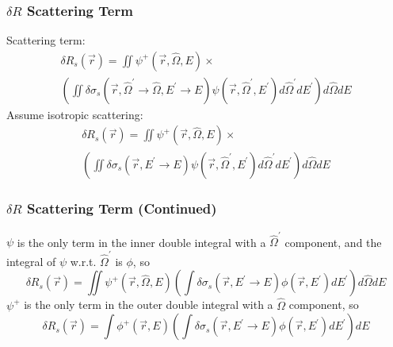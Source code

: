 \documentclass[t]{beamer}
\begin{document}
\begin{frame}
  \frametitle{$\delta R$ Scattering Term}
  Scattering term:
  \begin{multline}
    \delta R_s\left(\vec{r}\right) =
    \iint\psi^+\left(\vec{r},\hat{\Omega},E\right) \times \\
    \left(\iint\delta\sigma_s\left(\vec{r},\hat{\Omega}^\prime\rightarrow\hat{\Omega},E^\prime\rightarrow E\right)\psi\left(\vec{r},\hat{\Omega}^\prime,E^\prime\right)d\hat{\Omega}^\prime dE^\prime\right)d\hat{\Omega}dE
  \end{multline}
  Assume isotropic scattering:
  \begin{multline}
    \delta R_s\left(\vec{r}\right) =
    \iint\psi^+\left(\vec{r},\hat{\Omega},E\right) \times \\
    \left(\iint\delta\sigma_s\left(\vec{r},E^\prime\rightarrow E\right)\psi\left(\vec{r},\hat{\Omega}^\prime,E^\prime\right)d\hat{\Omega}^\prime dE^\prime\right)d\hat{\Omega}dE
  \end{multline}
\end{frame}

\begin{frame}
  \frametitle{$\delta R$ Scattering Term (Continued)}
  $\psi$ is the only term in the inner double integral with a $\hat{\Omega}^\prime$ component, and the integral of $\psi$ w.r.t. $\hat{\Omega}^\prime$ is $\phi$, so
  \begin{equation}
    \delta R_s\left(\vec{r}\right) =
    \iint\psi^+\left(\vec{r},\hat{\Omega},E\right)\left(\int\delta\sigma_s\left(\vec{r},E^\prime\rightarrow E\right)\phi\left(\vec{r},E^\prime\right)dE^\prime\right)d\hat{\Omega}dE
  \end{equation}
  $\psi^+$ is the only term in the outer double integral with a $\hat{\Omega}$ component, so
  \begin{equation}\boxed{
    \delta R_s\left(\vec{r}\right) =
    \int\phi^+\left(\vec{r},E\right)\left(\int\delta\sigma_s\left(\vec{r},E^\prime\rightarrow E\right)\phi\left(\vec{r},E^\prime\right)dE^\prime\right)dE
  }\end{equation}
\end{frame}
\end{document}
